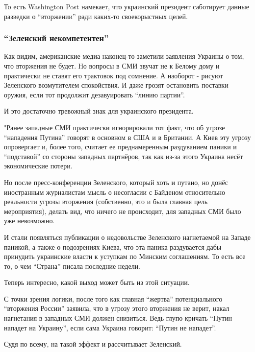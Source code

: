 То есть Washington Post намекает, что украинский президент саботирует данные
разведки о \enquote{вторжении} ради каких-то своекорыстных целей. 

\subsubsection{\enquote{Зеленский некомпетентен}}

Как видим, американские медиа наконец-то заметили заявления Украины о том, что
вторжения не будет. Но вопросы в СМИ звучат не к Белому дому и практически не
ставят его трактовок под сомнение. А наоборот - рисуют Зеленского возмутителем
спокойствия. И даже грозят остановить поставки оружия, если тот продолжит
дезавуировать \enquote{линию партии}. 



И это достаточно тревожный знак для украинского президента. 

"Ранее западные СМИ практически игнорировали тот факт, что об угрозе
\enquote{нападения Путина} говорят в основном в США и в Британии. А Киев эту
угрозу опровергает и, более того, считает ее преднамеренным раздуванием паники
и \enquote{подставой} со стороны западных партнёров, так как из-за этого
Украина несёт экономические потери.

Но после пресс-конференции Зеленского, который хоть и путано, но донёс
иностранным журналистам мысль о несогласии с Байденом относительно реальности
угрозы вторжения (собственно, это и была главная цель мероприятия), делать вид,
что ничего не происходит, для западных СМИ было уже невозможно.

И стали появляться публикации о недовольстве Зеленского нагнетаемой на Западе
паникой, а также о подозрениях Киева, что эта паника раздувается дабы принудить
украинские власти к уступкам по Минским соглашениям. То есть все то, о чем
\enquote{Страна} писала последние недели.

Теперь интересно, какой выход может быть из этой ситуации.

С точки зрения логики, после того как главная \enquote{жертва} потенциального
\enquote{вторжения России} заявила, что в угрозу этого вторжения не верит,
накал нагнетания в западных СМИ должен снизиться. Ведь глупо кричать
\enquote{Путин нападет на Украину}, если сама Украина говорит: \enquote{Путин
не нападет}.

Судя по всему, на такой эффект и рассчитывает Зеленский.

